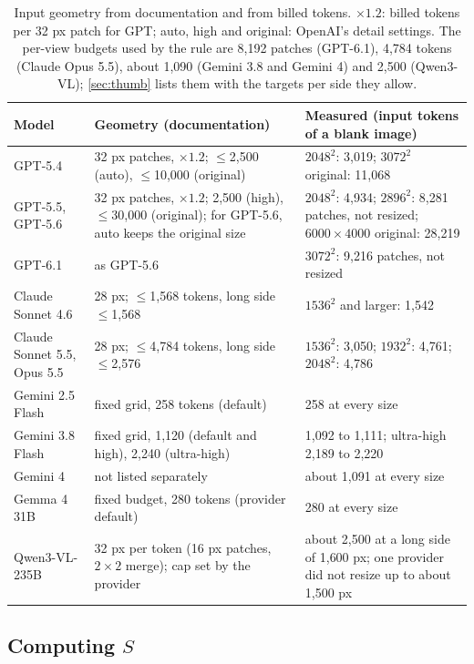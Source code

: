 \begin{table}[t]
\centering
\small
\begin{tabular}{p{3.0cm}p{5.5cm}p{6.2cm}}
\toprule
Model & Geometry (documentation) & Measured (input tokens of a blank image) \\
\midrule
GPT-5.4 & 32 px patches, $\times 1.2$; $\le$2{,}500 (auto), $\le$10{,}000 (original) & $2048^2$: 3{,}019; $3072^2$ original: 11{,}068 \\
GPT-5.5, GPT-5.6 & 32 px patches, $\times 1.2$; 2{,}500 (high), $\le$30{,}000 (original); for GPT-5.6, auto keeps the original size & $2048^2$: 4{,}934; $2896^2$: 8{,}281 patches, not resized; $6000\times4000$ original: 28{,}219 \\
GPT-6.1 & as GPT-5.6 & $3072^2$: 9{,}216 patches, not resized \\
Claude Sonnet 4.6 & 28 px; $\le$1{,}568 tokens, long side $\le$1{,}568 & $1536^2$ and larger: 1{,}542 \\
Claude Sonnet 5.5, Opus 5.5 & 28 px; $\le$4{,}784 tokens, long side $\le$2{,}576 & $1536^2$: 3{,}050; $1932^2$: 4{,}761; $2048^2$: 4{,}786 \\
Gemini 2.5 Flash & fixed grid, 258 tokens (default) & 258 at every size \\
Gemini 3.8 Flash & fixed grid, 1{,}120 (default and high), 2{,}240 (ultra-high) & 1{,}092 to 1{,}111; ultra-high 2{,}189 to 2{,}220 \\
Gemini 4 & not listed separately & about 1{,}091 at every size \\
Gemma 4 31B & fixed budget, 280 tokens (provider default) & 280 at every size \\
Qwen3-VL-235B & 32 px per token (16 px patches, $2\times2$ merge); cap set by the provider & about 2{,}500 at a long side of 1{,}600 px; one provider did not resize up to about 1{,}500 px \\
\bottomrule
\end{tabular}
\caption{Input geometry from documentation and from billed tokens. $\times 1.2$: billed tokens per 32 px patch for GPT; auto, high and original: OpenAI's detail settings. The per-view budgets used by the rule are 8{,}192 patches (GPT-6.1), 4{,}784 tokens (Claude Opus 5.5), about 1{,}090 (Gemini 3.8 and Gemini 4) and 2{,}500 (Qwen3-VL); \cref{sec:thumb} lists them with the targets per side they allow.}
\label{tab:calib}
\end{table}

\subsection{Computing $S$}
\label{sec:computeS}


